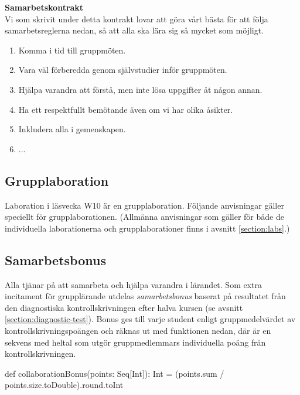\begin{oframed}
\noindent\textbf{Samarbetskontrakt}\\
Vi som skrivit under detta kontrakt lovar att göra vårt bästa för att följa samarbetsreglerna nedan, så att alla ska lära sig så mycket som möjligt.
\begin{enumerate}
\item Komma i tid till gruppmöten.
\item Vara väl förberedda genom självstudier inför gruppmöten.
\item Hjälpa varandra att förstå, men inte lösa uppgifter åt någon annan.
\item Ha ett respektfullt bemötande även om vi har olika åsikter.
\item Inkludera alla i gemenskapen.
\item ...
\end{enumerate}
\end{oframed}
\subsection{Grupplaboration}\label{subsection:grouplabs}
Laboration \texttt{\LabWeekTEN} i läsvecka W10 är en grupplaboration.
Följande anvisningar gäller speciellt för grupplaborationen. (Allmänna anvisningar som gäller för både de individuella laborationerna och grupplaborationer finns i avsnitt \ref{section:labs}.)

\begin{enumerate}

\end{enumerate}

\subsection{Samarbetsbonus}\label{section:bonus}

Alla tjänar på att samarbeta och hjälpa varandra i lärandet. Som extra incitament för grupplärande utdelas \emph{samarbetsbonus} baserat på resultatet från den diagnostiska kontrollskrivningen efter halva kursen (se avsnitt \ref{section:diagnostic-test}). Bonus ges till varje student enligt gruppmedelvärdet av kontrollskrivningspoängen och räknas ut med funktionen  nedan, där  är en sekvens med heltal som utgör gruppmedlemmars individuella poäng från kontrollskrivningen.

\begin{Code}
  def collaborationBonus(points: Seq[Int]): Int =
    (points.sum / points.size.toDouble).round.toInt
\end{Code}

